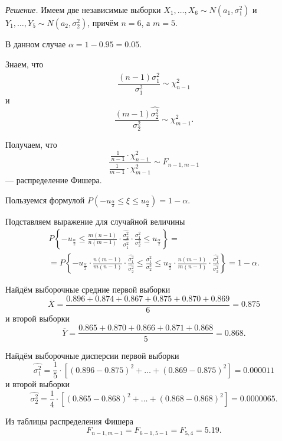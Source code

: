 \textit{Решение.}
Имеем две независимые выборки $X_1, \dotsc, X_6 \sim N \left( a_1, \sigma_1^2 \right) $ и
$Y_1, \dotsc, Y_5 \sim N \left( a_2, \sigma_2^2 \right) $, причём $n = 6$, а $m = 5$.

В данном случае $ \alpha = 1 - 0.95 = 0.05$.

Знаем, что
$$ \frac{ \left( n - 1 \right) \hat{ \sigma_1^2}}{ \sigma_1^2} \sim
  \chi_{n - 1}^2$$
и
$$ \frac{ \left( m - 1 \right) \hat{ \sigma_2^2}}{ \sigma_2^2} \sim
  \chi_{m - 1}^2.$$

Получаем, что
$$ \frac{ \frac{1}{n - 1} \cdot \chi_{n - 1}^2}{ \frac{1}{ m - 1} \cdot \chi_{m - 1}^2} \sim
  F_{n - 1, m - 1}$$
--- распределение Фишера.

Пользуемся формулой
$P \left( -u_{ \frac{ \alpha }{2}} \leq \xi \leq u_{ \frac{ \alpha }{2}} \right) =
  1 - \alpha $.

Подставляем выражение для случайной величины
\begin{equation*}
  \begin{split}
    P \left\{
      -u_{ \frac{ \alpha }{2}} \leq
      \frac{m \left( n - 1 \right) }{n \left( m - 1 \right) } \cdot
      \frac{ \hat{ \sigma_2^2}}{ \hat{ \sigma_1^2}} \cdot \frac{ \sigma_1^2}{ \sigma_2^2} \leq
      u_{ \frac{ \alpha }{2}}
    \right\} = \\
    = P \left\{
      -u_{ \frac{ \alpha }{2}} \cdot \frac{n \left( m - 1 \right) }{m \left( n - 1 \right) } \cdot
      \frac{ \hat{ \sigma_1^2}}{ \hat{ \sigma_2^2}} \leq
      \frac{ \sigma_1^2}{ \sigma_2^2} \leq
      u_{ \frac{ \alpha }{2}} \cdot \frac{n \left( m - 1 \right) }{m \left( n - 1 \right) } \cdot
      \frac{ \hat{ \sigma_1^2}}{ \hat{ \sigma_2^2}}
    \right\} =
    1 - \alpha.
  \end{split}
\end{equation*}

Найдём выборочные средние первой выборки
$$ \overline{X} =
  \frac{0.896 + 0.874 + 0.867 + 0.875 + 0.870 + 0.869}{6} =
  0.875$$
и второй выборки
$$ \overline{Y} =
  \frac{0.865 + 0.870 + 0.866 + 0.871 + 0.868}{5} =
  0.868.$$

Найдём выборочные дисперсии первой выборки
$$ \hat{ \sigma_1^2} =
  \frac{1}{5} \cdot
  \left[ \left( 0.896 - 0.875 \right)^2 + \dotsc + \left( 0.869 - 0.875 \right)^2 \right] =
  0.000011$$
и второй выборки
$$ \hat{ \sigma_2^2} =
  \frac{1}{4} \cdot
  \left[ \left( 0.865 - 0.868 \right)^2 + \dotsc + \left( 0.868 - 0.868 \right)^2 \right] =
  0.0000065.$$

Из таблицы распределения Фишера
$$F_{n - 1, m - 1} =
  F_{6 - 1, 5 - 1} =
  F_{5, 4} =
  5.19.$$

